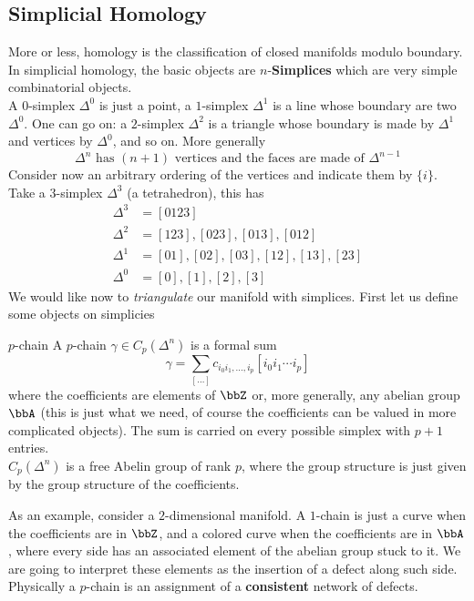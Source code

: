 \subsection{Simplicial Homology}\label{hom}
More or less, homology is the classification of closed manifolds modulo boundary. In simplicial homology, the basic objects are $n$-\textbf{Simplices}  which are very simple combinatorial objects.\\
A $0$-simplex $\Delta^{0}$ is just a point, a $1$-simplex $\Delta^{1}$ is a line whose boundary are two $\Delta^{0}$. One can go on: a $2$-simplex $\Delta^{2}$ is a triangle whose boundary is made by $\Delta^{1}$ and vertices by $\Delta^{0}$, and so on. More generally
\begin{equation}
	\Delta^{n}\text{ has }(n+1)\text{ vertices and the faces are made of }\Delta^{n-1}
\end{equation}
Consider now an arbitrary ordering of the vertices and indicate them by $\{i\}$. Take a $3$-simplex $\Delta^{3}$ (a tetrahedron), this has
\begin{equation}
\begin{split}
	\Delta^{3}&=[0123]\\
	\Delta^{2}&=[123],[023],[013],[012]\\
	\Delta^{1}&=[01],[02],[03],[12],[13],[23]\\
	\Delta^{0}&=[0],[1],[2],[3]
\end{split}
\end{equation}
We would like now to \textit{triangulate} our manifold with simplices. First let us define some objects on simplicies
\begin{defn}{$p$-chain}{}
	A $p$-chain $\gamma\in C_{p}(\Delta^{n})$ is a formal sum
	\begin{equation}
		\gamma=\sum_{[\ldots]}c_{i_{0}i_{1},\ldots,i_{p}}[i_{0}i_{1}\cdots i_{p}]
	\end{equation}
	where the coefficients are elements of $\bbZ$ or, more generally, any abelian group $\bbA$ (this is just what we need, of course the coefficients can be valued in more complicated objects). The sum is carried on every possible simplex with $p+1$ entries.\\
	$C_{p}(\Delta^{n})$ is a free Abelin group of rank $p$, where the group structure is just given by the group structure of the coefficients.
\end{defn}
As an example, consider a $2$-dimensional manifold. A $1$-chain is just a curve when the coefficients are in $\bbZ$, and a colored curve when the coefficients are in $\bbA$, where every side has an associated element of the abelian group stuck to it. We are going to interpret these elements as the insertion of a defect along such side. Physically a $p$-chain is an assignment of a \textbf{consistent} network of defects.\\
